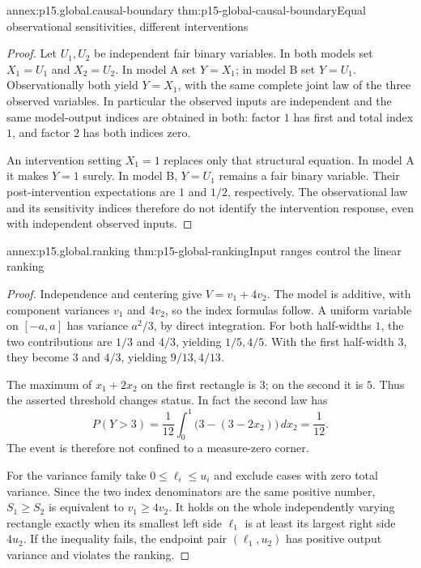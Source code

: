\begin{annexitem}{annex:p15.global.causal-boundary}
 {thm:p15-global-causal-boundary}{Equal observational sensitivities, different interventions}
\begin{proof}
Let \(U_1,U_2\) be independent fair binary variables. In both models set
\(X_1=U_1\) and \(X_2=U_2\).
In model A set \(Y=X_1\); in model B set \(Y=U_1\).
Observationally both yield \(Y=X_1\), with the same complete joint law
of the three observed variables. In particular the observed inputs are
independent and the same model-output indices are obtained in both:
factor \(1\) has first and total index \(1\), and factor \(2\) has
both indices zero.

An intervention setting \(X_1=1\) replaces only that structural equation.
In model A it makes \(Y=1\) surely. In model B, \(Y=U_1\) remains a
fair binary variable. Their post-intervention expectations are \(1\)
and \(1/2\), respectively.
The observational law and its sensitivity indices therefore do not
identify the intervention response, even with independent observed inputs.
\end{proof}
\end{annexitem}

\begin{annexitem}{annex:p15.global.ranking}
 {thm:p15-global-ranking}{Input ranges control the linear ranking}
\begin{proof}
Independence and centering give
\(V=v_1+4v_2\).
The model is additive, with component variances \(v_1\) and \(4v_2\),
so the index formulas follow.
A uniform variable on \([-a,a]\) has variance \(a^2/3\), by direct
integration. For both half-widths \(1\), the two contributions are
\(1/3\) and \(4/3\), yielding \(1/5,4/5\).
With the first half-width \(3\), they become \(3\) and \(4/3\),
yielding \(9/13,4/13\).

The maximum of \(x_1+2x_2\) on the first rectangle is \(3\);
on the second it is \(5\). Thus the asserted threshold changes status.
In fact the second law has
\[
 P(Y>3)=\frac1{12}\int_0^1
                   \bigl(3-(3-2x_2)\bigr)\,dx_2=\frac1{12}.
\]
The event is therefore not confined to a measure-zero corner.

For the variance family take
\(0\leq\ell_i\leq u_i\) and exclude cases with zero total variance.
Since the two index denominators are the same positive number,
\(S_1\geq S_2\) is equivalent to \(v_1\geq4v_2\).
It holds on the whole independently varying rectangle exactly when
its smallest left side \(\ell_1\) is at least its largest right side
\(4u_2\). If the inequality fails, the endpoint pair
\((\ell_1,u_2)\) has positive output variance and violates the ranking.
\end{proof}
\end{annexitem}
